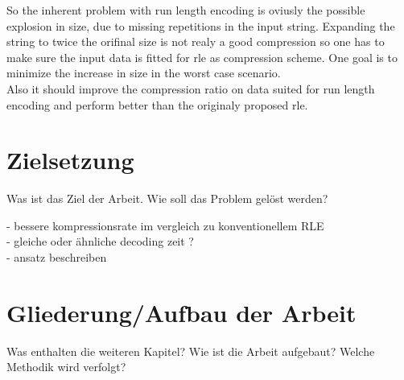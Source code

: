 So the inherent problem with run length encoding is oviusly the possible explosion in size, due to missing repetitions in the input string. Expanding the string to twice the orifinal size is not realy a good compression so one has to make sure the input data is fitted for rle as compression scheme. One goal is to minimize the increase in size in the worst case scenario.\\

Also it should improve the compression ratio on data suited for run length encoding and perform better than the originaly proposed rle.

\section{Zielsetzung}
\label{ch:Introduction:sec:Zielsetzung}

Was ist das Ziel der Arbeit. Wie soll das Problem gelöst werden?

- bessere kompressionsrate im vergleich zu konventionellem RLE\\
- gleiche oder ähnliche decoding zeit ?\\
- ansatz beschreiben\\





\section{Gliederung/Aufbau der Arbeit}
\label{ch:Intoduction:sec:Gliederung}

Was enthalten die weiteren Kapitel? Wie ist die Arbeit aufgebaut? Welche Methodik wird verfolgt?


